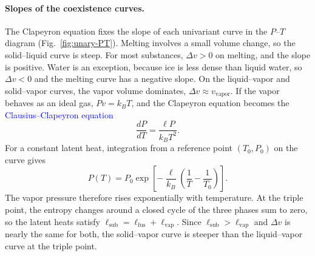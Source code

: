 \paragraph{Slopes of the coexistence curves.}
The Clapeyron equation fixes the slope of each univariant curve in the
$P$--$T$ diagram (Fig.~\ref{fig:unary-PT}). Melting involves a small volume
change, so the solid--liquid curve is steep. For most substances, $\Delta
v>0$ on melting, and the slope is positive. Water is an exception, because
ice is less dense than liquid water, so $\Delta v<0$ and the melting curve
has a negative slope. On the liquid--vapor and solid--vapor curves, the
vapor volume dominates, $\Delta v\approx v_{\text{vapor}}$. If the vapor
behaves as an ideal gas, $Pv=k_BT$, and the Clapeyron equation becomes the
\textcolor{blue}{Clausius--Clapeyron equation}
\begin{equation}
    \boxed{\frac{dP}{dT}=\frac{\ell P}{k_BT^2}.}
\end{equation}
For a constant latent heat, integration from a reference point $(T_0,P_0)$
on the curve gives
\begin{equation}
    \boxed{P(T)=P_0\exp\!\left[-\frac{\ell}{k_B}\left(\frac{1}{T}-\frac{1}{T_0}\right)\right].}
\end{equation}
The vapor pressure therefore rises exponentially with temperature. At the
triple point, the entropy changes around a closed cycle of the three phases
sum to zero, so the latent heats satisfy
$\ell_{\text{sub}}=\ell_{\text{fus}}+\ell_{\text{vap}}$. Since
$\ell_{\text{sub}}>\ell_{\text{vap}}$ and $\Delta v$ is nearly the same for
both, the solid--vapor curve is steeper than the liquid--vapor curve at the
triple point.

